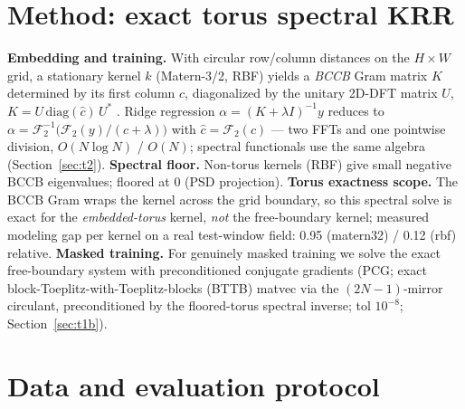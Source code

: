 \documentclass{article}
\begin{document}
\section{Method: exact torus spectral KRR}
\label{sec:method}

\textbf{Embedding and training.} With circular row/column distances on the
$H\times W$ grid, a stationary kernel $k$ (Matern-3/2, RBF) yields a
\emph{BCCB} Gram matrix $K$ determined by its first column $c$,
diagonalized by the unitary 2D-DFT matrix $U$,
$K=U\,\mathrm{diag}(\hat{c})\,U^{*}$
\cite{gray2006toeplitz,dietrich1997fast}. Ridge regression
$\alpha=(K+\lambda I)^{-1}y$ reduces to
$\alpha=\mathcal{F}^{-1}_{2}\!\bigl(\mathcal{F}_{2}(y)/(\widehat{c}+\lambda)
\bigr)$ with $\widehat{c}=\mathcal{F}_{2}(c)$
--- two FFTs and one pointwise division, $O(N\log N)$ / $O(N)$; spectral
functionals use the same algebra (Section~\ref{sec:t2}).
\textbf{Spectral floor.} Non-torus kernels (RBF) give small negative BCCB
eigenvalues; floored at 0 (PSD projection).
\textbf{Torus exactness scope.} The BCCB Gram wraps the kernel across the
grid boundary, so this spectral solve is exact for the \emph{embedded-torus}
kernel, \emph{not} the free-boundary kernel; measured modeling gap per kernel
on a real test-window field: 0.95 (matern32) / 0.12 (rbf) relative.
\textbf{Masked
training.} For genuinely masked training we solve the exact free-boundary
system with preconditioned conjugate gradients (PCG; exact
block-Toeplitz-with-Toeplitz-blocks (BTTB) matvec via the
$(2N-1)$-mirror circulant,
preconditioned by the floored-torus spectral inverse; tol $10^{-8}$;
Section~\ref{sec:t1b}).

\section{Data and evaluation protocol}
\label{sec:data}
\end{document}
